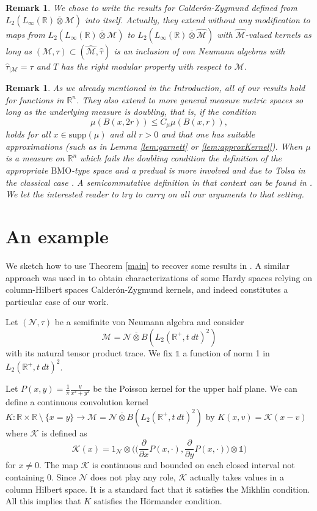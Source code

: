 \documentclass[psamsfonts]{amsart}
\newtheorem{remark}[theorem]{Remark}
\newcommand{\R}{\mathbb{R}}
\newcommand{\Ltwo}{L_2}
\newcommand{\BMO}{\mathrm{BMO}}
\begin{document}
\begin{remark}\label{smallext}
We chose to write the results for Calder\'on-Zygmund defined from $L_2(L_\infty(\R)\overline \otimes\mathcal M)$ into itself. Actually, they extend without any modification to maps from $L_2(L_\infty(\R)\overline \otimes\mathcal M)$ to $L_2(L_\infty(\R)\overline \otimes\widehat {\mathcal M})$ with $\widehat{\mathcal M}$-valued kernels as long as $(\mathcal M,\tau)\subset (\widehat{\mathcal M},\widehat \tau)$ is an inclusion of von Neumann algebras with $\widehat \tau_{|\mathcal M}=\tau$ and $T$ has the right modular property with respect to $\mathcal M$.
\end{remark}

\begin{remark}
  As we already mentioned in the Introduction, all of our results hold
  for functions in $\mathbb{R}^n$. They also extend to
  more general measure metric spaces so long as the underlying measure
  is doubling, that is, if the condition
$$
\mu(B(x,2r)) \leq C_\mu \mu(B(x,r)),
$$
holds for all $x \in \mathrm{supp}(\mu)$ and all $r>0$ and that one has suitable approximations (such as in Lemma \ref{lem:garnett} or \ref{lem:approxKernel}). When $\mu$ is
a measure on $\mathbb{R}^n$ which fails the doubling condition the
definition of the appropriate $\BMO$-type space and a predual is more
involved and due to Tolsa in the classical case \cite{T01}. A
semicommutative definition in that context can be found in
\cite{CP19}. We let the interested reader to try to carry on all our
arguments to that setting.
\end{remark}

\section{An  example}\label{example}

We sketch how to use Theorem \ref{main} to
recover some results in \cite{M07}. A similar approach was used in
\cite{XXX16} to obtain characterizations of some Hardy spaces relying on
column-Hilbert spaces Calder\'on-Zygmund kernels, and indeed constitutes a particular case of our work.

Let $(\mathcal N,\tau)$ be a semifinite von Neumann algebra and consider
$$\mathcal M=\mathcal N\overline \otimes B(\Ltwo(\R^+,t \ dt)^2)$$ with its natural tensor product trace. We fix $\mathds{1}$ a function of norm 1 in $\Ltwo(\R^+,t \ dt)^2$.

Let $P(x,y)=\frac 1 \pi \frac y{x^2+y^2}$ be the Poisson kernel for the
upper half plane. We can define a continuous convolution kernel
$K: \R\times\R \ \setminus \ \{x=y\} \to  \mathcal M=\mathcal N\overline \otimes B(\Ltwo(\R^+,t \ dt)^2)$ by $K(x,v)=\mathcal K (x-v)$ where $\mathcal K$ is defined as 
$$\mathcal K(x)= 1_{\mathcal N} \otimes \Big(\big(\frac {\partial }{\partial x} P(x,\cdot), \frac {\partial }{\partial y} P(x,\cdot)\big)\otimes \mathds{1}\Big)$$
for $x\neq 0$. The map $\mathcal K$ is continuous and bounded on each closed interval not
containing 0. Since $\mathcal N$ does not play any role, $\mathcal K$
actually takes values in a column Hilbert space. It is a standard fact that it satisfies the Mikhlin condition. All this implies that $K$ satisfies the H\"ormander condition.
\end{document}
